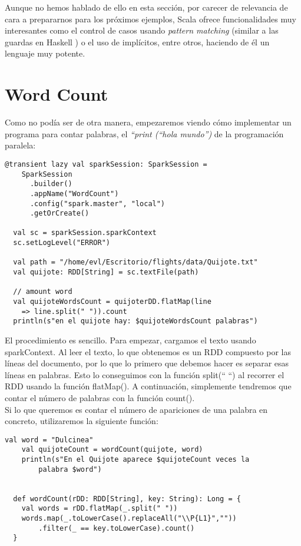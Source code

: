 Aunque no hemos hablado de ello en esta sección, por carecer de relevancia de cara a prepararnos para los próximos ejemplos, Scala ofrece funcionalidades muy interesantes como el control de casos usando \textit{pattern matching} (similar a las guardas en Haskell ) o el uso de implícitos, entre otros, haciendo de él un lenguaje muy potente. 

\section{Word Count}

Como no podía ser de otra manera, empezaremos viendo cómo implementar un programa para contar palabras, el \textit{“print (“hola mundo”)} de la programación paralela:\\

\begin{lstlisting}[frame=single]
  @transient lazy val sparkSession: SparkSession =
    SparkSession
      .builder()
      .appName("WordCount")
      .config("spark.master", "local")
      .getOrCreate()
      
  val sc = sparkSession.sparkContext
  sc.setLogLevel("ERROR")

  val path = "/home/evl/Escritorio/flights/data/Quijote.txt"
  val quijote: RDD[String] = sc.textFile(path)

  // amount word
  val quijoteWordsCount = quijoterDD.flatMap(line 
  	=> line.split(" ")).count
  println(s"en el quijote hay: $quijoteWordsCount palabras")

\end{lstlisting}

El procedimiento es sencillo. Para empezar, cargamos el texto usando sparkContext. Al leer el texto, lo que obtenemos es un RDD compuesto por las líneas del documento, por lo que lo primero que debemos hacer es separar esas líneas en palabras. Esto lo conseguimos con la función split(“ “) al recorrer el RDD usando la función flatMap(). A continuación, simplemente tendremos que contar el número de palabras con la función count().\\

Si lo que queremos es contar el número de apariciones de una palabra en concreto, utilizaremos la siguiente función:\\

\begin{lstlisting}[frame=single]
    val word = "Dulcinea"
    val quijoteCount = wordCount(quijote, word)
    println(s"En el Quijote aparece $quijoteCount veces la 
    	palabra $word")
    
    
  def wordCount(rDD: RDD[String], key: String): Long = {
    val words = rDD.flatMap(_.split(" "))
    words.map(_.toLowerCase().replaceAll("\\P{L1}",""))
    	.filter(_ == key.toLowerCase).count()
  }
    
\end{lstlisting}

